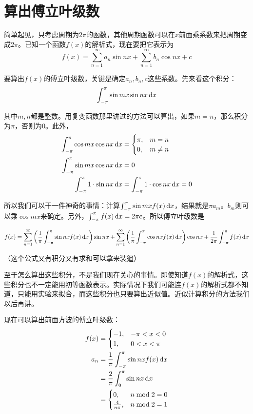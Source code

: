 \section{算出傅立叶级数}
简单起见，只考虑周期为$2 \pi$的函数，其他周期函数可以在$x$前面乘系数来把周期变成$2 \pi$。已知一个函数$f(x)$的解析式，现在要把它表示为
\begin{equation*}
f(x)=\sum_{n=1}^{\infty} a_n \sin n x+\sum_{n=1}^{\infty} b_n \cos n x+c
\end{equation*}

要算出$f(x)$的傅立叶级数，关键是确定$a_n,b_n,c$这些系数。先来看这个积分：
\begin{equation*}
\int_{-\pi}^{\pi} \sin m x \sin n x \mathop{}\!\mathrm{d} x
\end{equation*}

其中$m,n$都是整数。用复变函数那里讲过的方法可以算出，如果$m=n$，那么积分为$\pi$，否则为$0$。此外，
\begin{align*}
\int_{-\pi}^{\pi} \cos m x \cos n x \mathop{}\!\mathrm{d} x&=\begin{cases} \pi, &m=n \\ 0, &m \neq n \end{cases} \\
\int_{-\pi}^{\pi} \sin m x \cos n x \mathop{}\!\mathrm{d} x&=0 \\
\int_{-\pi}^{\pi} 1 \cdot \sin n x \mathop{}\!\mathrm{d} x&=\int_{-\pi}^{\pi} 1 \cdot \cos n x \mathop{}\!\mathrm{d} x=0
\end{align*}

所以我们可以干一件神奇的事情：计算$\int_{-\pi}^{\pi} \sin m x f(x) \mathop{}\!\mathrm{d} x$，结果就是$\pi a_m$。$b_m$则可以乘$\cos m x$来确定。另外，$\int_{-\pi}^{\pi} f(x) \mathop{}\!\mathrm{d} x=2 \pi c$。所以傅立叶级数是

\begin{equation*}
f(x)=\sum_{n=1}^{\infty} \left( \frac{1}{\pi} \int_{-\pi}^{\pi} \sin n x f(x) \mathop{}\!\mathrm{d} x \right) \sin n x+\sum_{n=1}^{\infty} \left( \frac{1}{\pi} \int_{-\pi}^{\pi} \cos n x f(x) \mathop{}\!\mathrm{d} x \right) \cos n x+\frac{1}{2 \pi} \int_{-\pi}^{\pi} f(x) \mathop{}\!\mathrm{d} x
\end{equation*}

（这个公式又有积分又有求和可以拿来装逼）

至于怎么算出这些积分，不是我们现在关心的事情。即使知道$f(x)$的解析式，这些积分也不一定能用初等函数表示。实际情况下我们可能连$f(x)$的解析式都不知道，只能用实验来拟合，而这些积分也只要算出近似值。近似计算积分的方法我们以后再讲。

现在可以算出前面方波的傅立叶级数：
\begin{align*}
f(x)&=\begin{cases} -1, &-\pi<x<0 \\ 1, &0<x<\pi \end{cases} \\
a_n&=\frac{1}{\pi} \int_{-\pi}^{\pi} \sin n x f(x) \mathop{}\!\mathrm{d} x \\
&=\frac{2}{\pi} \int_{0}^{\pi} \sin n x \mathop{}\!\mathrm{d} x \\
&=\begin{cases} 0, &n \bmod 2=0 \\ \frac{4}{n \pi}, &n \bmod 2=1 \end{cases}
\end{align*}

